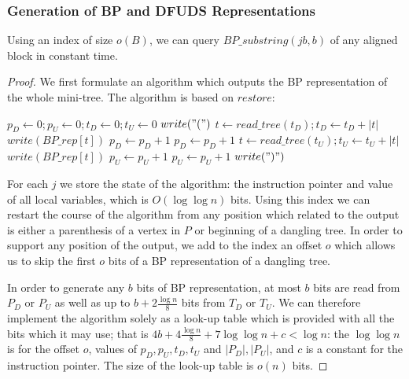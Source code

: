 \subsubsection{Generation of BP and DFUDS Representations}

\begin{lemma}
	Using an index of size $o(B)$, we can query $BP\_substring(j b, b)$ of any aligned block in constant time.
\end{lemma}
\begin{proof}
	We first formulate an algorithm which outputs the BP representation of the whole mini-tree.
	The algorithm is based on $restore$:
	
	\begin{algorithmic}
		\State $p_D \gets 0; p_U \gets 0; t_D \gets 0; t_U \gets 0$
			\State $write("(")$
				\State $t \gets read\_tree(t_D); t_D \gets t_D + |t|$
				\State $write(BP\_rep[t])$
				\State $p_D \gets p_D + 1$
			\EndWhile
			\State $p_D \gets p_D + 1$ 
		\EndWhile
				\State $t \gets read\_tree(t_U); t_U \gets t_U + |t|$
				\State $write(BP\_rep[t])$
				\State $p_U \gets p_U + 1$
			\EndWhile
			\State $p_U \gets p_U + 1$ 
			\State $write(")")$
		\EndWhile
	\EndFunction
	\end{algorithmic}
	
	For each $j$ we store the state of the algorithm: the instruction pointer and value of all local variables, which is $O(\log \log n)$ bits.
	Using this index we can restart the course of the algorithm from any position which related to the output is either a parenthesis of a vertex in $P$ or beginning of a dangling tree.
	In order to support any position of the output, we add to the index an offset $o$ which allows us to skip the first $o$ bits of a BP representation of a dangling tree.
	
	In order to generate any $b$ bits of BP representation, at most $b$ bits are read from $P_D$ or $P_U$ as well as up to $b + 2 \frac{\log n}{8}$ bits from $T_D$ or $T_U$.
	We can therefore implement the algorithm solely as a look-up table which is provided with all the bits which it may use; that is $4b + 4 \frac{\log n}{8} + 7 \log \log n + c < \log n$: the $\log \log n$ is for the offset $o$, values of $p_D, p_U, t_D, t_U$ and $|P_D|, |P_U|$, and $c$ is a constant for the instruction pointer.
	The size of the look-up table is $o(n)$ bits.
\end{proof}

